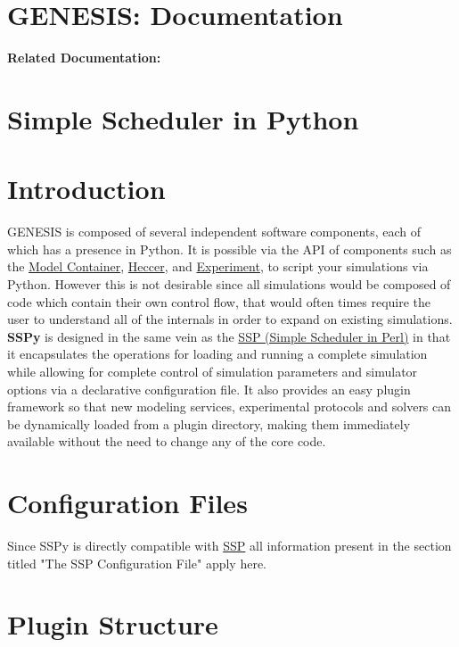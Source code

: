 \documentclass[12pt]{article}
\begin{document}
\section*{GENESIS: Documentation}

{\bf Related Documentation:}

\section*{Simple Scheduler in Python}

\section*{Introduction}

	GENESIS is composed of several independent software components, each of which has a presence in Python. It is possible via the API of components such as the \href{../model-container/model-container.tex}{Model Container}, \href{../heccer/heccer.tex}{Heccer}, and \href{../experiment/experiment.tex}{Experiment}, to script your simulations via Python. However this is not desirable since all simulations would be composed of code which contain their own control flow, that would often times require the user to understand all of the internals in order to expand on existing simulations. {\bf SSPy} is designed in the same vein as the \href{../ssp/ssp.tex}{SSP (Simple Scheduler in Perl)} in that it encapsulates the operations for loading and running a complete simulation while allowing for complete control of simulation parameters and simulator options via a declarative configuration file. It also provides an easy plugin framework so that new modeling services, experimental protocols and solvers can be dynamically loaded from a plugin directory, making them immediately available without the need to change any of the core code.  

\section*{Configuration Files}

Since SSPy is directly compatible with \href{../ssp/ssp.tex}{SSP} all information present in the section titled "The SSP Configuration File" apply here. 

\section*{Plugin Structure}
\end{document}

